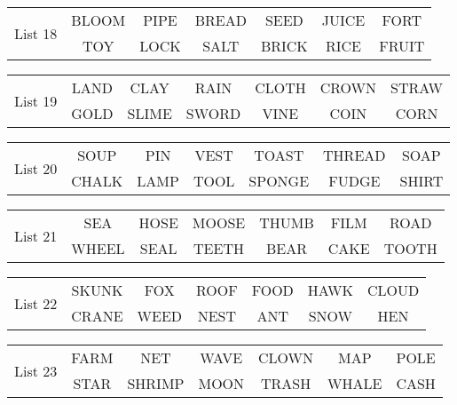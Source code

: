 \documentclass{article}
\begin{document}
\vspace{.1in}
\hspace{.5in}\begin{tabular}{r||c c c c c c }
\multirow{2}{*}{List 18} & BLOOM & PIPE & BREAD & SEED & JUICE & FORT\\
\cline{2-7}			& TOY & LOCK & SALT & BRICK & RICE & FRUIT\\
\end{tabular}

\vspace{.1in}
\hspace{.5in}\begin{tabular}{r||c c c c c c }
\multirow{2}{*}{List 19} & LAND & CLAY & RAIN & CLOTH & CROWN & STRAW\\
\cline{2-7}			& GOLD & SLIME & SWORD & VINE & COIN & CORN\\
\end{tabular}

\vspace{.1in}
\hspace{.5in}\begin{tabular}{r||c c c c c c }
\multirow{2}{*}{List 20} & SOUP & PIN & VEST & TOAST & THREAD & SOAP\\
\cline{2-7}			& CHALK & LAMP & TOOL & SPONGE & FUDGE & SHIRT\\
\end{tabular}

\vspace{.1in}
\hspace{.5in}\begin{tabular}{r||c c c c c c }
\multirow{2}{*}{List 21} & SEA & HOSE & MOOSE & THUMB & FILM & ROAD\\
\cline{2-7}			& WHEEL & SEAL & TEETH & BEAR & CAKE & TOOTH\\
\end{tabular}

\vspace{.1in}
\hspace{.5in}\begin{tabular}{r||c c c c c c }
\multirow{2}{*}{List 22} & SKUNK & FOX & ROOF & FOOD & HAWK & CLOUD\\
\cline{2-7}			& CRANE & WEED & NEST & ANT & SNOW & HEN\\
\end{tabular}

\vspace{.1in}
\hspace{.5in}\begin{tabular}{r||c c c c c c }
\multirow{2}{*}{List 23} & FARM & NET & WAVE & CLOWN & MAP & POLE\\
\cline{2-7}			& STAR & SHRIMP & MOON & TRASH & WHALE & CASH\\
\end{tabular}
\end{document}
